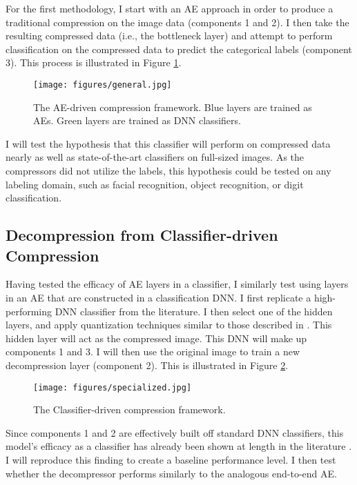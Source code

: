 \documentclass[twoside,11pt]{article}
\begin{document}
For the first methodology, I start with an AE approach in order 
to produce a traditional compression on the image data (components 1 and 2). 
I then take the resulting compressed data (i.e., the bottleneck layer) and attempt 
to perform classification on
the compressed data to predict the categorical labels (component 3).
This process is illustrated in Figure \ref{fig:general}.

\begin{figure}[h]
  \texttt{[image: figures/general.jpg]}
  \caption{The AE-driven compression framework. Blue layers are trained as AEs. Green layers are trained as DNN classifiers.}
  \label{fig:general}
\end{figure}

I will test the hypothesis that this classifier will perform on compressed data 
nearly as well as state-of-the-art classifiers on full-sized images. 
As the compressors did not utilize the labels, this hypothesis could be tested on 
any labeling domain, such as facial recognition, object recognition, or digit classification.

\subsection{Decompression from Classifier-driven Compression} \label{special}

Having tested the efficacy of AE layers in a classifier, I similarly test using layers in an
AE that are constructed in a classification DNN.
I first replicate a high-performing DNN classifier from the literature. 
I then select one of the hidden layers, and apply 
quantization techniques similar to those described in \citet{hubara2018}. This hidden layer 
will act as the compressed image. This DNN will make up components 1 and 3. I 
will then use the original image to train a new decompression layer (component 2).  
This is illustrated in Figure \ref{fig:specialized}.

\begin{figure}[h]
  \texttt{[image: figures/specialized.jpg]}
  \caption{The Classifier-driven compression framework.}
  \label{fig:specialized}
\end{figure}

Since components 1 and 2 are effectively built off standard DNN classifiers, 
this model’s efficacy as a classifier has already been shown at length in the 
literature \citep{krizhevsky2012imagenet}. I will reproduce this finding to create a 
baseline performance level. I then test whether 
the decompressor performs similarly to the analogous end-to-end AE.
\end{document}
